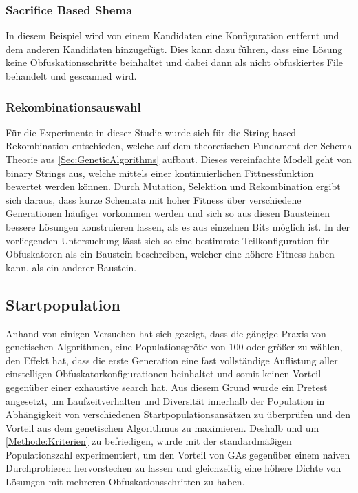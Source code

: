 \subsubsection{Sacrifice Based Shema}
In diesem Beispiel wird von einem Kandidaten eine Konfiguration entfernt und dem anderen Kandidaten hinzugefügt. Dies kann dazu führen, dass eine Lösung keine Obfuskationsschritte beinhaltet und dabei dann als nicht obfuskiertes File behandelt und gescanned wird.

\subsubsection{Rekombinationsauswahl}
Für die Experimente in dieser Studie wurde sich für die String-based Rekombination entschieden, welche auf dem theoretischen Fundament der Schema Theorie aus \ref{Sec:GeneticAlgorithms} aufbaut. Dieses vereinfachte Modell geht von binary Strings aus, welche mittels einer kontinuierlichen Fittnessfunktion bewertet werden können. Durch Mutation, Selektion und Rekombination ergibt sich daraus, dass kurze Schemata mit hoher Fitness über verschiedene Generationen häufiger vorkommen werden und sich so aus diesen Bausteinen bessere Lösungen konstruieren lassen, als es aus einzelnen Bits möglich ist. In der vorliegenden Untersuchung lässt sich so eine bestimmte Teilkonfiguration für Obfuskatoren als ein Baustein beschreiben, welcher eine höhere Fitness haben kann, als ein anderer Baustein.




\subsection{Startpopulation} \label{GA:inital_population}
Anhand von einigen Versuchen hat sich gezeigt, dass die gängige Praxis von genetischen Algorithmen, eine Populationsgröße von 100 oder größer zu wählen, den Effekt hat, dass die erste Generation eine fast vollständige Auflistung aller einstelligen Obfuskatorkonfigurationen beinhaltet und somit keinen Vorteil gegenüber einer exhaustive search hat. Aus diesem Grund wurde ein Pretest angesetzt, um Laufzeitverhalten und Diversität innerhalb der Population in Abhängigkeit von verschiedenen Startpopulationsansätzen zu überprüfen und den Vorteil aus dem genetischen Algorithmus zu maximieren.
Deshalb und um \ref{Methode:Kriterien} zu befriedigen, wurde mit der standardmäßigen Populationszahl experimentiert, um den Vorteil von GAs gegenüber einem naiven Durchprobieren hervorstechen zu lassen und gleichzeitig eine höhere Dichte von Lösungen mit mehreren Obfuskationsschritten zu haben.

